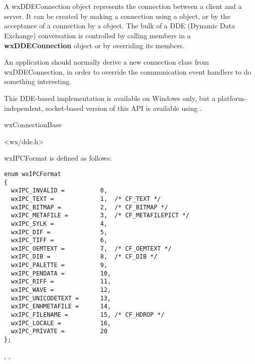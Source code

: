 \section{}\label{wxddeconnection}

A wxDDEConnection object represents the connection between a client and a
server. It can be created by making a connection using a\rtfsp
{} object, or by the acceptance of a connection by a\rtfsp
{} object. The bulk of a DDE (Dynamic Data Exchange)
conversation is controlled by
calling members in a {\bf wxDDEConnection} object or by overriding its
members.

An application should normally derive a new connection class from
wxDDEConnection, in order to override the communication event handlers
to do something interesting.

This DDE-based implementation is available on Windows only,
but a platform-independent, socket-based version
of this API is available using .


wxConnectionBase\\


<wx/dde.h>


wxIPCFormat is defined as follows:

\begin{verbatim}
enum wxIPCFormat
{
  wxIPC_INVALID =          0,
  wxIPC_TEXT =             1,  /* CF_TEXT */
  wxIPC_BITMAP =           2,  /* CF_BITMAP */
  wxIPC_METAFILE =         3,  /* CF_METAFILEPICT */
  wxIPC_SYLK =             4,
  wxIPC_DIF =              5,
  wxIPC_TIFF =             6,
  wxIPC_OEMTEXT =          7,  /* CF_OEMTEXT */
  wxIPC_DIB =              8,  /* CF_DIB */
  wxIPC_PALETTE =          9,
  wxIPC_PENDATA =          10,
  wxIPC_RIFF =             11,
  wxIPC_WAVE =             12,
  wxIPC_UNICODETEXT =      13,
  wxIPC_ENHMETAFILE =      14,
  wxIPC_FILENAME =         15, /* CF_HDROP */
  wxIPC_LOCALE =           16,
  wxIPC_PRIVATE =          20
};
\end{verbatim}


, , 


